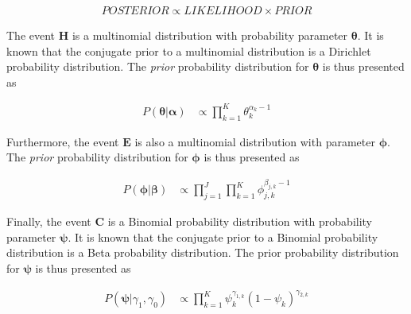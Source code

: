 \begin{equation}
      \label{eq:bhh:optimisation_step:map:bayesian_analysis_lamens}
      \begin{split}
            POSTERIOR \propto LIKELIHOOD \times PRIOR
      \end{split}
\end{equation}

The event $\boldsymbol{H}$ is a multinomial distribution with probability parameter $\boldsymbol{\theta}$. It is known that the conjugate prior to a multinomial distribution is a Dirichlet probability distribution. The \textit{prior} probability distribution for $\boldsymbol{\theta}$ is thus presented as

\begin{equation}
      \label{eq:bhh:optimisation_step:map:map_theta_prior}
      \begin{split}
            P(\boldsymbol{\theta} | \boldsymbol{\alpha})
            &\propto \prod_{k=1}^{K} \theta_{k}^{\alpha_{k} -1}
      \end{split}
\end{equation}

Furthermore, the event $\boldsymbol{E}$ is also a multinomial distribution with parameter $\boldsymbol{\phi}$. The \textit{prior} probability distribution for $\boldsymbol{\phi}$ is thus presented as

\begin{equation}
      \label{eq:bhh:optimisation_step:map:map_phi_prior}
      \begin{split}
            P(\boldsymbol{\phi} \vert \boldsymbol{\beta})
            &\propto \prod_{j=1}^{J}  \prod_{k=1}^{K} \phi_{j,k}^{\beta_{j,k} -1}
      \end{split}
\end{equation}

Finally, the event $\boldsymbol{C}$ is a Binomial probability distribution with probability parameter $\boldsymbol{\psi}$. It is known that the conjugate prior to a Binomial probability distribution is a Beta probability distribution. The prior probability distribution for $\boldsymbol{\psi}$ is thus presented as

\begin{equation}
      \label{eq:bhh:optimisation_step:map:map_psi_prior}
      \begin{split}
            P(\boldsymbol{\psi} | \gamma_{1}, \gamma_{0})
            &\propto \prod_{k=1}^{K} \psi_{k}^{\gamma_{1,k}} (1- \psi_{k})^{\gamma_{2,k}}
      \end{split}
\end{equation}

